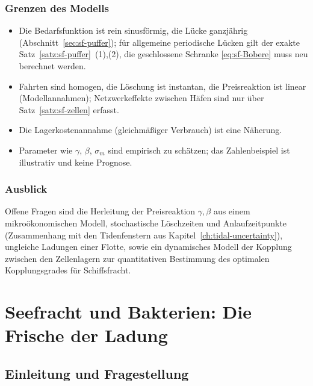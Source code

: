 \documentclass[a4paper, 12pt, twoside, openright]{report}
\theoremstyle{definition}
\theoremstyle{definition}
\begin{document}
\subsection{Grenzen des Modells}

\begin{itemize}
  \item Die Bedarfsfunktion ist rein sinusförmig, die Lücke ganzjährig
    (Abschnitt~\ref{sec:sf-puffer}); für allgemeine periodische Lücken gilt der
    exakte Satz~\ref{satz:sf-puffer}~(1),(2), die geschlossene Schranke
    \eqref{eq:sf-Bobere} muss neu berechnet werden.
  \item Fahrten sind homogen, die Löschung ist instantan, die Preisreaktion ist
    linear (Modellannahmen); Netzwerkeffekte zwischen Häfen sind nur über
    Satz~\ref{satz:sf-zellen} erfasst.
  \item Die Lagerkostenannahme (gleichmäßiger Verbrauch) ist eine Näherung.
  \item Parameter wie $\gamma$, $\beta$, $\sigma_m$ sind empirisch zu schätzen; das
    Zahlenbeispiel ist illustrativ und keine Prognose.
\end{itemize}

\subsection{Ausblick}

Offene Fragen sind die Herleitung der Preisreaktion $\gamma,\beta$ aus einem
mikroökonomischen Modell, stochastische Löschzeiten und Anlaufzeitpunkte
(Zusammenhang mit den Tidenfenstern aus Kapitel~\ref{ch:tidal-uncertainty}),
ungleiche Ladungen einer Flotte, sowie ein dynamisches Modell der Kopplung zwischen
den Zellenlagern zur quantitativen Bestimmung des optimalen Kopplungsgrades für
Schiffsfracht.

\cleardoublepage


\chapter{Seefracht und Bakterien: Die Frische der Ladung}
\label{ch:sea-bacteria}

\section{Einleitung und Fragestellung}
\end{document}
